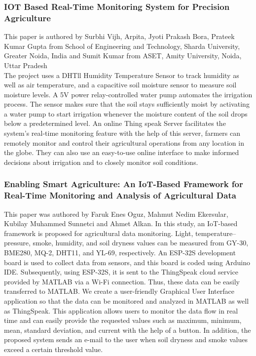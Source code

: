 \documentclass[12pt, a4paper]{article}
\begin{document}
\subsubsection{IOT Based Real-Time Monitoring System for Precision Agriculture}
This paper is authored by Surbhi Vijh, Arpita, Jyoti Prakash Bora, Prateek Kumar Gupta from School of Engineering and Technology, Sharda University, Greater Noida, India and Sumit Kumar from ASET, Amity University, Noida, Uttar Pradesh \cite{10463399}\\
The project uses a DHTll Humidity Temperature Sensor to track humidity as well as air temperature, and a capacitive soil moisture sensor to measure soil moisture levels. A 5V power relay-controlled water pump automates the irrigation process. The sensor makes sure that the soil stays sufficiently moist by activating a water pump to start irrigation whenever the moisture content of the soil drops below a predetermined level. An online Thing speak Server facilitates the system's real-time monitoring feature  with the help of this server, farmers can remotely monitor and control their agricultural operations from any location in the globe. They can also use an easy-to-use online interface to make informed decisions about irrigation and to closely monitor soil conditions.

\subsubsection{Enabling Smart Agriculture: An IoT-Based Framework for Real-Time Monitoring and Analysis of Agricultural Data}
This paper was authored by Faruk Enes Oguz, Mahmut Nedim Ekersular, Kubilay Muhammed Sunnetci and Ahmet Alkan. \cite{oguz2024enabling}
In this study, an IoT-based framework is proposed for agricultural data monitoring. Light, temperature–pressure, smoke, humidity, and soil dryness values can be measured from GY-30, BME280, MQ-2, DHT11, and YL-69, respectively. An ESP-32S development board is used to collect data from sensors, and this board is coded using Arduino IDE. Subsequently, using ESP-32S, it is sent to the ThingSpeak cloud service provided by MATLAB via a Wi-Fi connection. Thus, these data can be easily transferred to MATLAB. We create a user-friendly Graphical User Interface application so that the data can be monitored and analyzed in MATLAB as well as ThingSpeak. This application allows users to monitor the data flow in real time and can easily provide the requested values such as maximum, minimum, mean, standard deviation, and current with the help of a button. In addition, the proposed system sends an e-mail to the user when soil dryness and smoke values exceed a certain threshold value.
\end{document}
